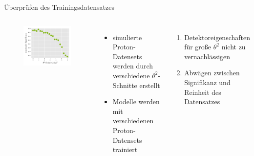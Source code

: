 \documentclass[aspectratio=1610, professionalfonts, 9pt]{beamer}
\begin{document}
\begin{frame}{Überprüfen des Trainingsdatensatzes}
  \begin{columns}[onlytextwidth]
	\begin{figure}
	  \centering
	  \includegraphics[width=\textwidth]{./Plots/corr_sig_theta2.pdf}
	\end{figure}
	\begin{itemize}
	  \item simulierte Proton-Datensets werden durch verschiedene $\theta^{2}$-Schnitte erstellt
	  \item Modelle werden mit verschiedenen Proton-Datensets trainiert
	\end{itemize}
	\begin{enumerate}
	  \item Detektoreigenschaften für große $\theta^{2}$ nicht zu vernachlässigen
	  \item Abwägen zwischen Signifikanz und Reinheit des Datensatzes
	\end{enumerate}
  \end{columns}
\end{frame}
\end{document}
